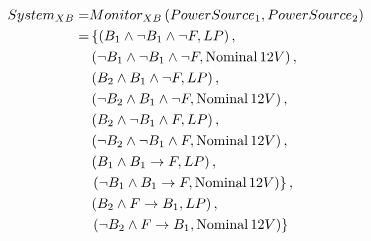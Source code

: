 \begin{align*}
System_{XB} = & Monitor_{XB} \left(PowerSource_1, PowerSource_2\right) \\
  = & \left\{ 
      \left(B_1 \land \lnot B_1 \land \lnot F, LP\right), \right.\\
  &   \left(\lnot B_1 \land \lnot B_1 \land \lnot F, \mathop{\mathrm{Nominal}} 12V\right), \\
  &   \left(B_2 \land B_1 \land \lnot F, LP\right),\\
  &   \left(\lnot B_2 \land B_1 \land \lnot F, \mathop{\mathrm{Nominal}} 12V\right), \\
  &   \left(B_2 \land \lnot B_1 \land F, LP\right), \\
  &   \left(\lnot B_2 \land \lnot B_1 \land F, \mathop{\mathrm{Nominal}} 12V\right),\\
  &   \left(B_1 \land B_1 \rightarrow F, LP\right), \\
  &   \left.\left(\lnot B_1 \land B_1 \rightarrow F, \mathop{\mathrm{Nominal}} 12V\right)\right\}, \\
  &   \left(B_2 \land F \rightarrow B_1, LP\right), \\
  &   \left.\left(\lnot B_2 \land F \rightarrow B_1, \mathop{\mathrm{Nominal}} 12V\right)\right\}
    \\
\end{align*}

